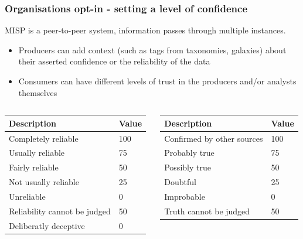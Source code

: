 \begin{frame}
\frametitle{Organisations opt-in - setting a level of confidence}
    MISP is a peer-to-peer system, information passes through multiple instances.
    \begin{itemize}
            \item Producers can add context (such as tags from taxonomies, galaxies) about their asserted confidence or the reliability of the data
        \item Consumers can have different levels of trust in the producers and/or analysts themselves
    \end{itemize}

    \begin{small}
    \begin{columns}[T] %
    \begin{column}{.40\textwidth}
        \begin{tabular}{|ll|}
            \hline
            \textbf{Description} & \textbf{Value}\\
            \hline
            Completely reliable & 100\\
            Usually reliable & 75\\
            Fairly reliable & 50\\
            Not usually reliable & 25\\
            Unreliable & 0\\
            Reliability cannot be judged & 50\\
            Deliberatly deceptive & 0\\
            \hline
        \end{tabular}
    \end{column}%
    \hfill%
    \begin{column}{.48\textwidth}
        \begin{tabular}{|ll|}
            \hline
            \textbf{Description} & \textbf{Value}\\
            \hline
            Confirmed by other sources & 100\\
            Probably true & 75\\
            Possibly true & 50\\
            Doubtful & 25\\
            Improbable & 0\\
            Truth cannot be judged & 50\\
            \hline
        \end{tabular}
    \end{column}%
    \end{columns}
    \end{small}
\end{frame}

